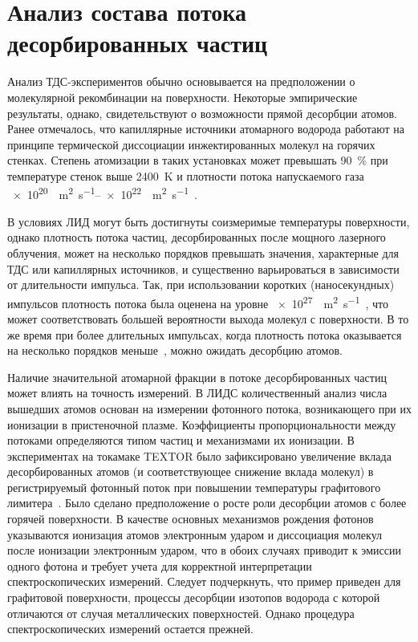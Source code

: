 \section{Анализ состава потока десорбированных частиц}\label{sec:ch4/sec2}

Анализ ТДС-экспериментов обычно основывается на предположении о молекулярной рекомбинации на поверхности. Некоторые эмпирические результаты, однако, свидетельствуют о возможности прямой десорбции атомов. Ранее отмечалось, что капиллярные источники атомарного водорода работают на принципе термической диссоциации инжектированных молекул на горячих стенках. Степень атомизации в таких установках может превышать \SI{90}{\percent} при температуре стенок выше \SI{2400}{\kelvin} и плотности потока напускаемого газа \SIrange{e20}{e22}{\per\meter\squared\per\second}~\cite{Tschersich2000,Tschersich2008}.

В условиях ЛИД могут быть достигнуты соизмеримые температуры поверхности, однако плотность потока частиц, десорбированных после мощного лазерного облучения, может на несколько порядков превышать значения, характерные для ТДС или капиллярных источников, и существенно варьироваться в зависимости от длительности импульса. Так, при использовании коротких (наносекундных) импульсов плотность потока была оценена на уровне \SI{e27}{\per\meter\squared\per\second}~\cite{Gasparyan2021}, что может соответствовать большей вероятности выхода молекул с поверхности. В то же время при более длительных импульсах, когда плотность потока оказывается на несколько порядков меньше~\cite{Yu2019}, можно ожидать десорбцию атомов.

Наличие значительной атомарной фракции в потоке десорбированных частиц может влиять на точность измерений. В ЛИДС количественный анализ числа вышедших атомов основан на измерении фотонного потока, возникающего при их ионизации в пристеночной плазме. Коэффициенты пропорциональности между потоками определяются типом частиц и механизмами их ионизации. В экспериментах на токамаке TEXTOR было зафиксировано увеличение вклада десорбированных атомов (и соответствующее снижение вклада молекул) в регистрируемый фотонный поток при повышении температуры графитового лимитера~\cite{Brezinsek2005}. Было сделано предположение о росте роли десорбции атомов с более горячей поверхности. В качестве основных механизмов рождения фотонов указываются ионизация атомов электронным ударом и диссоциация молекул после ионизации электронным ударом, что в обоих случаях приводит к эмиссии одного фотона и требует учета для корректной интерпретации спектроскопических измерений. Следует подчеркнуть, что пример приведен для графитовой поверхности, процессы десорбции изотопов водорода с которой отличаются от случая металлических поверхностей. Однако процедура спектроскопических измерений остается прежней.

